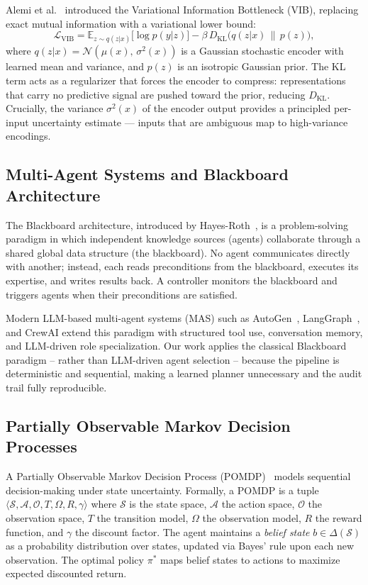 \documentclass[conference]{IEEEtran}
\begin{document}
Alemi et al.~\cite{alemi2017deep} introduced the Variational
Information Bottleneck (VIB), replacing exact mutual information
with a variational lower bound:
\begin{equation}
    \mathcal{L}_{\text{VIB}} =
        \mathbb{E}_{z\sim q(z|x)}\bigl[\log p(y|z)\bigr]
        - \beta\,D_{\text{KL}}\bigl(q(z|x)\,\|\,p(z)\bigr),
    \label{eq:vib}
\end{equation}
where $q(z|x)=\mathcal{N}(\mu(x),\,\sigma^2(x))$ is a Gaussian
stochastic encoder with learned mean and variance, and $p(z)$ is an
isotropic Gaussian prior. The KL term acts as a regularizer that
forces the encoder to compress: representations that carry no
predictive signal are pushed toward the prior, reducing
$D_{\text{KL}}$. Crucially, the variance $\sigma^2(x)$ of the encoder
output provides a principled per-input uncertainty estimate --- inputs
that are ambiguous map to high-variance encodings.

\subsection{Multi-Agent Systems and Blackboard Architecture}

The Blackboard architecture, introduced by Hayes-Roth~\cite{hayes1985blackboard},
is a problem-solving paradigm in which independent knowledge sources
(agents) collaborate through a shared global data structure (the
blackboard). No agent communicates directly with another; instead,
each reads preconditions from the blackboard, executes its expertise,
and writes results back. A controller monitors the blackboard and
triggers agents when their preconditions are satisfied.

Modern LLM-based multi-agent systems (MAS) such as AutoGen~\cite{wu2023autogen},
LangGraph~\cite{langgraph2024}, and CrewAI extend this paradigm with
structured tool use, conversation memory, and LLM-driven role
specialization. Our work applies the classical Blackboard paradigm --
rather than LLM-driven agent selection -- because the pipeline is
deterministic and sequential, making a learned planner unnecessary and
the audit trail fully reproducible.

\subsection{Partially Observable Markov Decision Processes}

A Partially Observable Markov Decision Process
(POMDP)~\cite{kaelbling1998planning} models sequential decision-making
under state uncertainty. Formally, a POMDP is a tuple
$\langle\mathcal{S},\mathcal{A},\mathcal{O},T,\Omega,R,\gamma\rangle$
where $\mathcal{S}$ is the state space, $\mathcal{A}$ the action
space, $\mathcal{O}$ the observation space, $T$ the transition model,
$\Omega$ the observation model, $R$ the reward function, and
$\gamma$ the discount factor. The agent maintains a \emph{belief
state} $b\in\Delta(\mathcal{S})$ as a probability distribution over
states, updated via Bayes' rule upon each new observation. The optimal
policy $\pi^*$ maps belief states to actions to maximize expected
discounted return.
\end{document}
